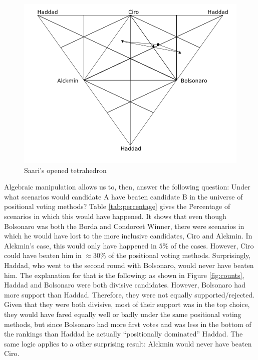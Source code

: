 \documentclass[hidelinks,11pt]{article}
\begin{document}
\begin{figure}[H]
 \centering
 \includegraphics[width=0.8\columnwidth,
 height=0.3\textheight]{./images/opened_tetrahedron.png}
 \caption{Saari's opened tetrahedron }
 \label{fig:ot}
\end{figure}


Algebraic manipulation allows us to, then, answer the following question: Under what scenarios would candidate A have beaten candidate B in the universe of positional voting methods? Table \ref{tab:percentage} gives the Percentage of scenarios in which this would have happened. It shows that even though Bolsonaro was both the Borda and Condorcet Winner, there were scenarios in which he would have lost to the more inclusive candidates, Ciro and Alckmin. In Alckmin's case, this would only have happened in \(5\%\) of the cases. However, Ciro could have beaten him in \(\approx 30\%\) of the positional voting methods. Surprisingly, Haddad, who went to the second round with Bolsonaro, would never have beaten him. The explanation for that is the following: as shown in Figure \ref{fig:counts}, Haddad and Bolsonaro were both divisive candidates. However, Bolsonaro had more support than Haddad. Therefore, they were not equally supported/rejected. Given that they were both divisive, most of their support was in the top choice, they would have fared equally well or badly under the same positional voting methods, but since Bolsonaro had more first votes and was less in the bottom of the rankings than Haddad he actually ``positionally dominated'' Haddad. The same logic applies to a other surprising result: Alckmin would never have beaten Ciro.


\end{document}
